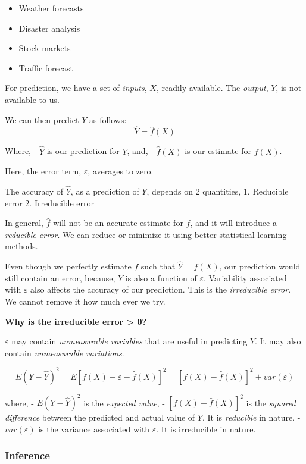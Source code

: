 \documentclass[11pt]{article}
\providecommand{\tightlist}{%
      \setlength{\itemsep}{0pt}\setlength{\parskip}{0pt}}
\begin{document}
\begin{itemize}
\tightlist
\item
  Weather forecasts
\item
  Disaster analysis
\item
  Stock markets
\item
  Traffic forecast
\end{itemize}

For prediction, we have a set of \emph{inputs}, \(X\), readily
available. The \emph{output}, \(Y\), is not available to us.

We can then predict \(Y\) as follows: \[
\hat{Y} = \hat{f}(X)
\]

Where, - \(\hat{Y}\) is our prediction for \(Y\), and, - \(\hat{f}(X)\)
is our estimate for \(f(X)\).

Here, the error term, \(\varepsilon\), averages to zero.

The accuracy of \(\hat{Y}\), as a prediction of \(Y\), depends on 2
quantities, 1. Reducible error 2. Irreducible error

In general, \(\hat{f}\) will not be an accurate estimate for \(f\), and
it will introduce a \emph{reducible error}. We can reduce or minimize it
using better statistical learning methods.

Even though we perfectly estimate \(f\) such that \(\hat{Y} = f(X)\),
our prediction would still contain an error, because, \(Y\) is also a
function of \(\varepsilon\). Variability associated with \(\varepsilon\)
also affects the accuracy of our prediction. This is the
\emph{irreducible error}. We cannot remove it how much ever we try.

\textbf{Why is the irreducible error \textgreater{} 0?}

\(\varepsilon\) may contain \emph{unmeasurable variables} that are
useful in predicting \(Y\). It may also contain \emph{unmeasurable
variations}.

\[
E(Y - \hat{Y})^{2} = E[f(X) + \varepsilon - \hat{f}(X)]^{2} = [f(X) - \hat{f}(X)]^{2} + var(\varepsilon)
\]

where, - \(E(Y - \hat{Y})^{2}\) is the \emph{expected value}, -
\([f(X) - \hat{f}(X)]^{2}\) is the \emph{squared difference} between the
predicted and actual value of \(Y\). It is \emph{reducible} in nature. -
\(var({\varepsilon})\) is the variance associated with \(\varepsilon\).
It is irreducible in nature.

    \hypertarget{inference}{%
\subsubsection{Inference}\label{inference}}
\end{document}
